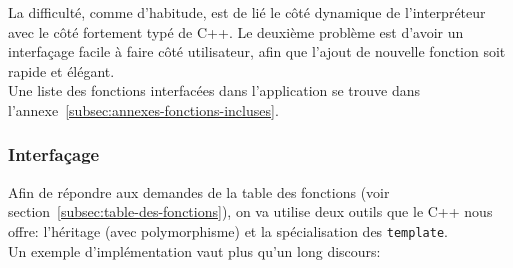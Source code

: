 \documentclass[french]{article}
\begin{document}
			La difficulté, comme d'habitude, est de lié le côté dynamique de l'interpréteur avec le côté fortement typé de C++. Le deuxième problème est d'avoir un interfaçage facile à faire côté utilisateur, afin que l'ajout de nouvelle fonction soit rapide et élégant.\\
			
			Une liste des fonctions interfacées dans l'application se trouve dans l'annexe~\ref{subsec:annexes-fonctions-incluses}. 
			
			\subsubsection{Interfaçage}
				\label{subsubsec:interfacage}
				Afin de répondre aux demandes de la table des fonctions (voir section~\ref{subsec:table-des-fonctions}), on va utilise deux outils que le C++ nous offre: l'héritage (avec polymorphisme) et la spécialisation des \texttt{template}.\\
				
				Un exemple d'implémentation vaut plus qu'un long discours:
				
\end{document}
